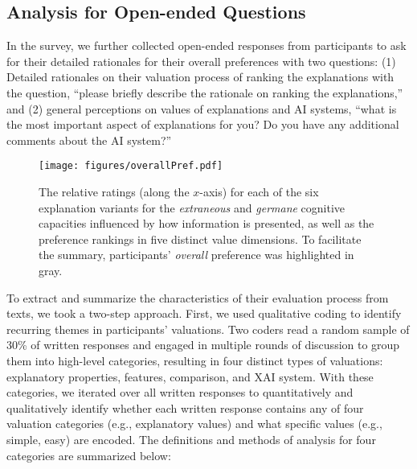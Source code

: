 \subsection{Analysis for Open-ended Questions}
\label{sec:method-open}

In the survey, we further collected open-ended responses from participants to ask for their detailed rationales for their overall preferences with two questions: (1) Detailed rationales on their valuation process of ranking the explanations with the question, “please briefly describe the rationale on ranking the explanations,” and (2) general perceptions on values of explanations and AI systems, “what is the most important aspect of explanations for you? Do you have any additional comments about the AI system?”

\begin{figure}[h]%
\centering
\texttt{[image: figures/overallPref.pdf]}
\caption{The relative ratings (along the $x$-axis) for each of the six explanation variants for the {\it extraneous} and {\it germane} cognitive capacities influenced by how information is presented, as well as the preference rankings in five distinct value dimensions. To facilitate the summary, participants' {\it overall} preference was highlighted in gray.}\label{fig:overallPref}
\end{figure}

To extract and summarize the characteristics of their evaluation process from texts, we took a two-step approach. First, we used qualitative coding to identify recurring themes in participants' valuations. Two coders read a random sample of 30\% of written responses and engaged in multiple rounds of discussion to group them into high-level categories, resulting in four distinct types of valuations: explanatory properties, features, comparison, and XAI system. With these categories, we iterated over all written responses to quantitatively and qualitatively identify whether each written response contains any of four valuation categories (e.g., explanatory values) and what specific values (e.g., simple, easy) are encoded. The definitions and methods of analysis for four categories are summarized below:

